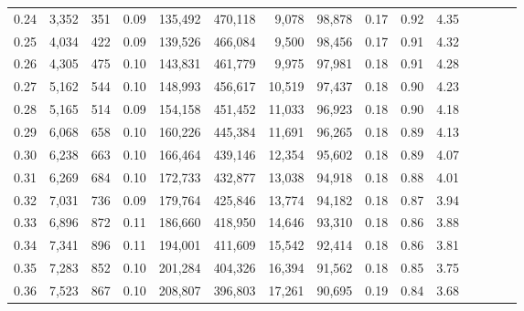 \begin{tabular}{rrrcrrrrrrrrrrr}
0.24 &   3,352 &    351 &                                       0.09 &  135,492 &  470,118 &    9,078 &   98,878 &  0.17 &  0.92 &                         4.35 \\
0.25 &   4,034 &    422 &                                       0.09 &  139,526 &  466,084 &    9,500 &   98,456 &  0.17 &  0.91 &                         4.32 \\
0.26 &   4,305 &    475 &                                       0.10 &  143,831 &  461,779 &    9,975 &   97,981 &  0.18 &  0.91 &                         4.28 \\
0.27 &   5,162 &    544 &                                       0.10 &  148,993 &  456,617 &   10,519 &   97,437 &  0.18 &  0.90 &                         4.23 \\
0.28 &   5,165 &    514 &                                       0.09 &  154,158 &  451,452 &   11,033 &   96,923 &  0.18 &  0.90 &                         4.18 \\
0.29 &   6,068 &    658 &                                       0.10 &  160,226 &  445,384 &   11,691 &   96,265 &  0.18 &  0.89 &                         4.13 \\
0.30 &   6,238 &    663 &                                       0.10 &  166,464 &  439,146 &   12,354 &   95,602 &  0.18 &  0.89 &                         4.07 \\
0.31 &   6,269 &    684 &                                       0.10 &  172,733 &  432,877 &   13,038 &   94,918 &  0.18 &  0.88 &                         4.01 \\
0.32 &   7,031 &    736 &                                       0.09 &  179,764 &  425,846 &   13,774 &   94,182 &  0.18 &  0.87 &                         3.94 \\
0.33 &   6,896 &    872 &                                       0.11 &  186,660 &  418,950 &   14,646 &   93,310 &  0.18 &  0.86 &                         3.88 \\
0.34 &   7,341 &    896 &                                       0.11 &  194,001 &  411,609 &   15,542 &   92,414 &  0.18 &  0.86 &                         3.81 \\
0.35 &   7,283 &    852 &                                       0.10 &  201,284 &  404,326 &   16,394 &   91,562 &  0.18 &  0.85 &                         3.75 \\
0.36 &   7,523 &    867 &                                       0.10 &  208,807 &  396,803 &   17,261 &   90,695 &  0.19 &  0.84 &                         3.68 \\

\end{tabular}
